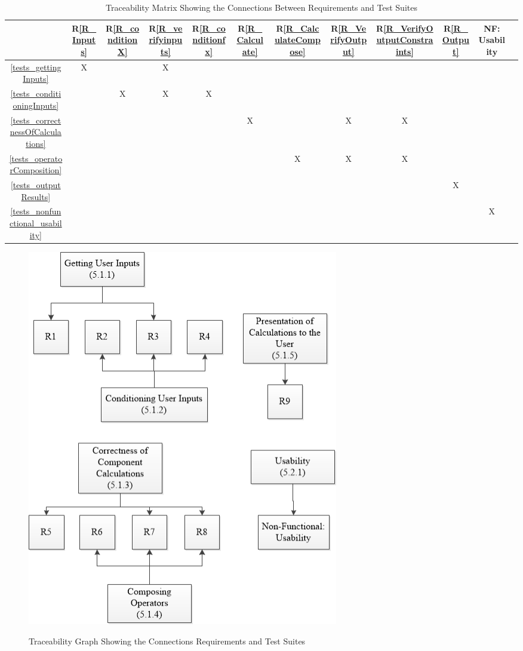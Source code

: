 \documentclass[12pt, titlepage]{article}
\newcommand{\rref}[1]{R\ref{#1}}
\begin{document}
\begin{table}[H]
	\centering
		\begin{tabular}{|c|c|c|c|c|c|c|c|c|c|c|c|}
			\hline
			& \rref{R_Inputs} & \rref{R_conditionX} & \rref{R_verifyinputs} & 
			\rref{R_conditionfx}& \rref{R_Calculate} &\rref{R_CalculateCompose} 
			&\rref{R_VerifyOutput} &\rref{R_VerifyOutputConstraints} 
			&\rref{R_Output} & NF: Usability
			\\
			\hline
			\ref{tests_gettingInputs}       & X &  & X &&&&&&&  \\ \hline
			\ref{tests_conditioningInputs}       &  & X & X  &X&&&&&&  \\ 
			\hline
			\ref{tests_correctnessOfCalculations}       &  &  &   &&X&&X&X& & 
			\\ 
			\hline
			\ref{tests_operatorComposition}       &  &  &   &&&X&X&X& & \\ 
			\hline
			\ref{tests_outputResults}       &  &  &   &&&&&& X &\\ \hline
			\ref{tests_nonfunctional_usability}       &  &  &   &&&&&&  &X\\ 
			\hline
		\end{tabular}
	\caption{Traceability Matrix Showing the Connections Between Requirements 
	and Test Suites}
	\label{Table:req2tests}
\end{table}

 \begin{figure}[H]
	\begin{center}
		{
			\includegraphics[width=0.66\textwidth]{figures/ReqToTest.png}
		}
		\caption{\label{Fig:req2tests} Traceability Graph Showing the 
		Connections Requirements and Test Suites}
	\end{center}
\end{figure}
				
\end{document}
